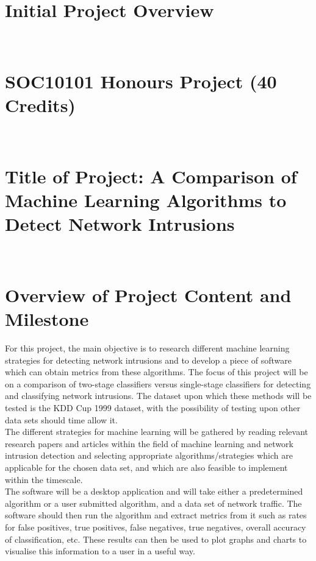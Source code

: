 \vspace{0.3cm}

\section*{Initial Project Overview}\\

\vspace{0.3cm}

\section*{SOC10101 Honours Project (40 Credits)} \\

\vspace{0.3cm}

\section*{Title of Project: A Comparison of Machine Learning Algorithms to Detect Network Intrusions} \\

\vspace{0.3cm}

\section*{Overview of Project Content and Milestone}
\noindent For this project, the main objective is to research different machine learning strategies for detecting network intrusions and to develop a piece of software which can obtain metrics from these algorithms. The focus of this project will be on a comparison of two-stage classifiers versus single-stage classifiers for detecting and classifying network intrusions. The dataset upon which these methods will be tested is the KDD Cup 1999 dataset, with the possibility of testing upon other data sets should time allow it. \\


\noindent The different strategies for machine learning will be gathered by reading relevant research papers and articles within the field of machine learning and network intrusion detection and selecting appropriate algorithms/strategies which are applicable for the chosen data set, and which are also feasible to implement within the timescale. \\


\noindent The software will be a desktop application and will take either a predetermined algorithm or a user submitted algorithm, and a data set of network traffic. The software should then run the algorithm and extract metrics from it such as rates for false positives, true positives, false negatives, true negatives, overall accuracy of classification, etc. These results can then be used to plot graphs and charts to visualise this information to a user in a useful way. \\


